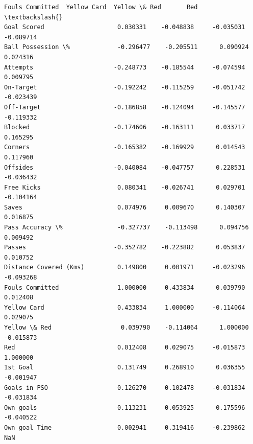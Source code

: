 \documentclass[11pt, a4paper]{report}
\begin{document}
\begin{tcolorbox}[breakable, size=fbox, boxrule=.5pt, pad at break*=1mm, opacityfill=0]
\begin{Verbatim}[commandchars=\\\{\}]
                        Fouls Committed  Yellow Card  Yellow \& Red       Red  \textbackslash{}
Goal Scored                    0.030331    -0.048838     -0.035031 -0.089714
Ball Possession \%             -0.296477    -0.205511      0.090924  0.024316
Attempts                      -0.248773    -0.185544     -0.074594  0.009795
On-Target                     -0.192242    -0.115259     -0.051742 -0.023439
Off-Target                    -0.186858    -0.124094     -0.145577 -0.119332
Blocked                       -0.174606    -0.163111      0.033717  0.165295
Corners                       -0.165382    -0.169929      0.014543  0.117960
Offsides                      -0.040084    -0.047757      0.228531 -0.036432
Free Kicks                     0.080341    -0.026741      0.029701 -0.104164
Saves                          0.074976     0.009670      0.140307  0.016875
Pass Accuracy \%               -0.327737    -0.113498      0.094756  0.009492
Passes                        -0.352782    -0.223882      0.053837  0.010752
Distance Covered (Kms)         0.149800     0.001971     -0.023296 -0.093268
Fouls Committed                1.000000     0.433834      0.039790  0.012408
Yellow Card                    0.433834     1.000000     -0.114064  0.029075
Yellow \& Red                   0.039790    -0.114064      1.000000 -0.015873
Red                            0.012408     0.029075     -0.015873  1.000000
1st Goal                       0.131749     0.268910      0.036355 -0.001947
Goals in PSO                   0.126270     0.102478     -0.031834 -0.031834
Own goals                      0.113231     0.053925      0.175596 -0.040522
Own goal Time                  0.002941     0.319416     -0.239862       NaN


\end{Verbatim}
\end{tcolorbox}
\end{document}
